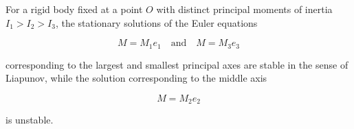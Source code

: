 For a rigid body fixed at a point $O$ with distinct principal moments of inertia $I_1 > I_2 > I_3$, the stationary solutions of the Euler equations

$$M = M_1 e_1 \quad \text{and} \quad M = M_3 e_3$$

corresponding to the largest and smallest principal axes are stable in the sense of Liapunov, while the solution corresponding to the middle axis

$$M = M_2 e_2$$

is unstable.
